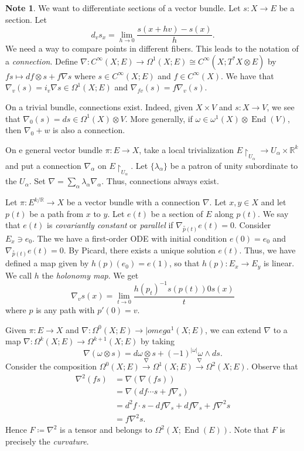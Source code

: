 \documentclass[10pt,letterpaper,cm]{nupset}
\theoremstyle{definition}
\newtheorem{note}[definition]{Note}
\theoremstyle{theorem}
\theoremstyle{remark}
\newcommand{\R}{\mathbb{R}}
\newcommand{\1}{\mathbb{1}}
\newcommand{\0}{\vec 0}
\DeclareMathOperator{\ed}{End}
\begin{document}
\begin{note}
We want to differentiate sections of a vector bundle. Let $s : X \to E$ be a section. Let $$ d_v{s_x} = \lim_{h \to 0} \frac{s(x+hv) - s(x)}{h}   .$$ We need a way to compare points in different fibers. This leads to the notation of a \textit{connection}. Define $\nabla : C^{\infty}(X; E) \to \Omega^1(X; E)\cong C^{\infty}(X; T^{\ast}X \otimes E)$ by $f{s} \mapsto df \otimes s + f{\nabla{s}}$ where $s \in C^{\infty}(X; E)$ and $f \in C^{\infty}(X)$.  We have that $\nabla_v(s) = i_v\nabla{s} \in \Omega^1(X; E)$ and $\nabla_{fv}(s) = f \nabla_v(s)$. 

On a trivial bundle, connections exist. Indeed, given $X \times V$ and $s : X \to V$, we see that $\nabla_0(s) = ds \in \Omega^1(X) \otimes V$. More generally, if $\omega \in \omega^1(X) \otimes \ed(V)$, then $\nabla_0 + w$ is also a connection.

On e general vector bundle $ \pi : E \to X$, take a local trivialization $E \restriction_{U_{\alpha}} \to U_{\alpha} \times \R^k$ and put a connection $\nabla_{\alpha}$ on $E \restriction_{U_{\alpha}}$. Let $\{\lambda_{\alpha}\}$ be a patron of unity subordinate to the $U_{\alpha}$. Set $\nabla = \sum_{\alpha} \lambda_{\alpha}\nabla_{\alpha}$. Thus, connections always exist. 

Let $\pi : E^{k/\R} \to X$ be a vector bundle with a connection $\nabla$. Let $x,y \in X$ and let $p(t)$ be a path from $x$ to $y$. Let $e(t)$ be a section of $E$ along $p(t)$. We say that $e(t)$ is \textit{covariantly constant} or \textit{parallel} if $\nabla_{\overset{\circ}{p}(t)}e(t) = 0$. Consider $E_x \ni e_0$. The we have a first-order ODE with initial condition $e(0) = e_0$ and $\nabla_{\overset{\circ}{p}(t)}e(t) =0$. By Picard, there exists a unique solution $e(t)$. Thus, we have defined a map given by $h(p)(e_0) = e(1)$, so that $h(p) : E_x \to E_y$ is linear. We call $h$ the \textit{holonomy map}. We get $$  \nabla_v{s}(x) = \lim_{t \to 0} \frac{h(p_t)^{-1}s(p(t)) 0s(x)}{t}  $$ where $p$ is any path with $p'(0) = v$.

Given $\pi: E \to X$ and $\nabla : \Omega^0(X; E) \to |omega^1(X; E)$, we can extend $\nabla$ to a map $\nabla : \Omega^k(X; E) \to \Omega^{k+1}(X; E)$ by taking $$\nabla(\omega \otimes s) = d{\omega}\otimes s +({-}1)^{|\omega|}{\omega} \wedge d{s}.$$ Consider the composition $\Omega^0(X; E) \overset{\nabla}{\longrightarrow} \Omega^1(X; E) \overset{\nabla}{\longrightarrow} \Omega^2(X; E)$. Observe that 
\begin{align*}
\nabla^2(fs) & = \nabla(\nabla(fs))
\\ & = \nabla(df \cdots s + f\nabla_s)
\\ & = d^2f \cdot s - d{f}\nabla_s + df{\nabla_s} + f \nabla^2{s}
\\ & = f\nabla^2{s}.
\end{align*}
Hence $F\coloneqq \nabla^2$ is a tensor and belongs to $\Omega^2(X; \ed(E))$. Note that $F$ is  precisely the \textit{curvature}.
\end{note}
\end{document}
